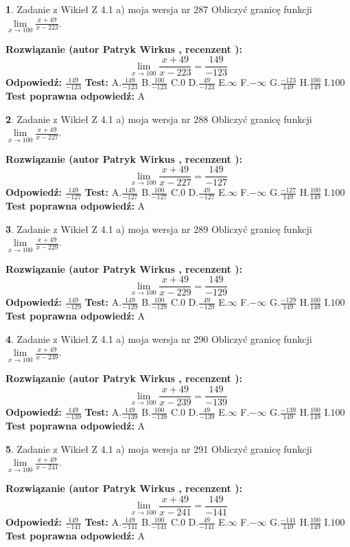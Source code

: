 \documentclass[12pt, a4paper]{article}
\theoremstyle{definition} %
\newtheorem{zad}{}
\newcommand{\zadStart}[1]{\begin{zad}#1\newline}
\newcommand{\zadStop}{\end{zad}}
\newcommand{\rozwStart}[2]{\noindent \textbf{Rozwiązanie (autor #1 , recenzent #2): }\newline}
\newcommand{\rozwStop}{\newline}
\newcommand{\odpStart}{\noindent \textbf{Odpowiedź:}\newline}
\newcommand{\odpStop}{\newline}
\newcommand{\testStart}{\noindent \textbf{Test:}\newline}
\newcommand{\testStop}{\newline}
\newcommand{\kluczStart}{\noindent \textbf{Test poprawna odpowiedź:}\newline}
\newcommand{\kluczStop}{\newline}
\begin{document}
\zadStart{Zadanie z Wikieł Z 4.1 a) moja wersja nr 287}
Obliczyć granicę funkcji $\lim\limits_{x\to100}\frac{x+49}{x-223}$.
\zadStop
\rozwStart{Patryk Wirkus}{}
$$\lim\limits_{x\to100}\frac{x+49}{x-223} = \frac{149}{-123}$$
\rozwStop
\odpStart
$\frac{149}{-123}$
\odpStop
\testStart
A.$\frac{149}{-123}$
B.$\frac{100}{-123}$
C.$0$
D.$\frac{49}{-123}$
E.$\infty$
F.$-\infty$
G.$\frac{-123}{149}$
H.$\frac{100}{149}$
I.$100$
\testStop
\kluczStart
A
\kluczStop



\zadStart{Zadanie z Wikieł Z 4.1 a) moja wersja nr 288}
Obliczyć granicę funkcji $\lim\limits_{x\to100}\frac{x+49}{x-227}$.
\zadStop
\rozwStart{Patryk Wirkus}{}
$$\lim\limits_{x\to100}\frac{x+49}{x-227} = \frac{149}{-127}$$
\rozwStop
\odpStart
$\frac{149}{-127}$
\odpStop
\testStart
A.$\frac{149}{-127}$
B.$\frac{100}{-127}$
C.$0$
D.$\frac{49}{-127}$
E.$\infty$
F.$-\infty$
G.$\frac{-127}{149}$
H.$\frac{100}{149}$
I.$100$
\testStop
\kluczStart
A
\kluczStop



\zadStart{Zadanie z Wikieł Z 4.1 a) moja wersja nr 289}
Obliczyć granicę funkcji $\lim\limits_{x\to100}\frac{x+49}{x-229}$.
\zadStop
\rozwStart{Patryk Wirkus}{}
$$\lim\limits_{x\to100}\frac{x+49}{x-229} = \frac{149}{-129}$$
\rozwStop
\odpStart
$\frac{149}{-129}$
\odpStop
\testStart
A.$\frac{149}{-129}$
B.$\frac{100}{-129}$
C.$0$
D.$\frac{49}{-129}$
E.$\infty$
F.$-\infty$
G.$\frac{-129}{149}$
H.$\frac{100}{149}$
I.$100$
\testStop
\kluczStart
A
\kluczStop



\zadStart{Zadanie z Wikieł Z 4.1 a) moja wersja nr 290}
Obliczyć granicę funkcji $\lim\limits_{x\to100}\frac{x+49}{x-239}$.
\zadStop
\rozwStart{Patryk Wirkus}{}
$$\lim\limits_{x\to100}\frac{x+49}{x-239} = \frac{149}{-139}$$
\rozwStop
\odpStart
$\frac{149}{-139}$
\odpStop
\testStart
A.$\frac{149}{-139}$
B.$\frac{100}{-139}$
C.$0$
D.$\frac{49}{-139}$
E.$\infty$
F.$-\infty$
G.$\frac{-139}{149}$
H.$\frac{100}{149}$
I.$100$
\testStop
\kluczStart
A
\kluczStop



\zadStart{Zadanie z Wikieł Z 4.1 a) moja wersja nr 291}
Obliczyć granicę funkcji $\lim\limits_{x\to100}\frac{x+49}{x-241}$.
\zadStop
\rozwStart{Patryk Wirkus}{}
$$\lim\limits_{x\to100}\frac{x+49}{x-241} = \frac{149}{-141}$$
\rozwStop
\odpStart
$\frac{149}{-141}$
\odpStop
\testStart
A.$\frac{149}{-141}$
B.$\frac{100}{-141}$
C.$0$
D.$\frac{49}{-141}$
E.$\infty$
F.$-\infty$
G.$\frac{-141}{149}$
H.$\frac{100}{149}$
I.$100$
\testStop
\kluczStart
A
\kluczStop
\end{document}
